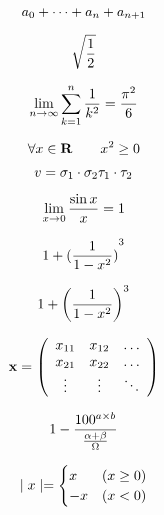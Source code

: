 \documentclass{article}
\begin{document}
  \paragraph{}
  \begin{equation}
    \centering
    \label{Firs}
    a_0 + \cdots + a_n + a_{n + 1}
  \end{equation}

  \begin{equation}
    \centering
    \sqrt{\frac{1}{2}}
  \end{equation}

  \begin{equation}
    \centering
    \lim_{n \to \infty}\sum_{k = 1}^n
    \frac{1}{k^2} = \frac{\pi^2}{6}
  \end{equation}

  \begin{equation}
    \centering
    \forall x \in \mathbf{R} \qquad x^{2} \geq 0
  \end{equation}

  \begin{equation}
    \centering
    v = \sigma_1 \cdot\sigma_2 \tau_1 \cdot\tau_2
  \end{equation}

  \begin{equation}
    \centering
    \lim_{x \rightarrow 0} \frac{\sin x}{x} = 1
  \end{equation}

  \begin{equation}
    \centering
    1 + {(\frac{1}{1-x^{2}})}^3
  \end{equation}

  \begin{equation}
    \centering
    1 + {\left( \frac{1}{1-x^{2}} \right)}^3
  \end{equation}

  \begin{equation}
    \centering
    \mathbf{x} = {\left(%
        \begin{array}{ccc}
        x_{11} & x_{12} & \ldots \\
        x_{21} & x_{22} & \ldots \\
        \vdots & \vdots & \ddots
        \end{array}
        \right)}
  \end{equation}

  \begin{equation}
    \centering
    1 - \frac{100^{a \times b}}{\frac{\alpha + \beta}{\Omega}}
  \end{equation}

  \begin{equation}
    \centering
    \mid x \mid =
    \begin{cases}
      x  & (x \geq 0) \\
      -x & (x < 0)
    \end{cases}
  \end{equation}
\end{document}
